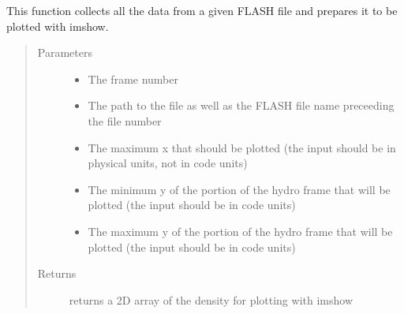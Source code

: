 \documentclass[letterpaper,10pt,english]{sphinxmanual}
\begin{document}

\begin{fulllineitems}
\label{\detokenize{mcrat_movie:mcrat_movie.get_flash_data}}
This function collects all the data from a given FLASH file and prepares it to be plotted with imshow.
\begin{quote}\begin{description}
\item[{Parameters}] \leavevmode\begin{itemize}
\item {} 
 \textendash{} The frame number

\item {} 
 \textendash{} The path to the file as well as the FLASH file name preceeding the file number

\item {} 
 \textendash{} The maximum x that should be plotted (the input should be in physical units, not in code units)

\item {} 
 \textendash{} The minimum y of the portion of the hydro frame that will be plotted (the input should be in code units)

\item {} 
 \textendash{} The maximum y of the portion of the hydro frame that will be plotted (the input should be in code units)

\end{itemize}

\item[{Returns}] \leavevmode
returns a 2D array of the density for plotting with imshow

\end{description}\end{quote}

\end{fulllineitems}

\end{document}
